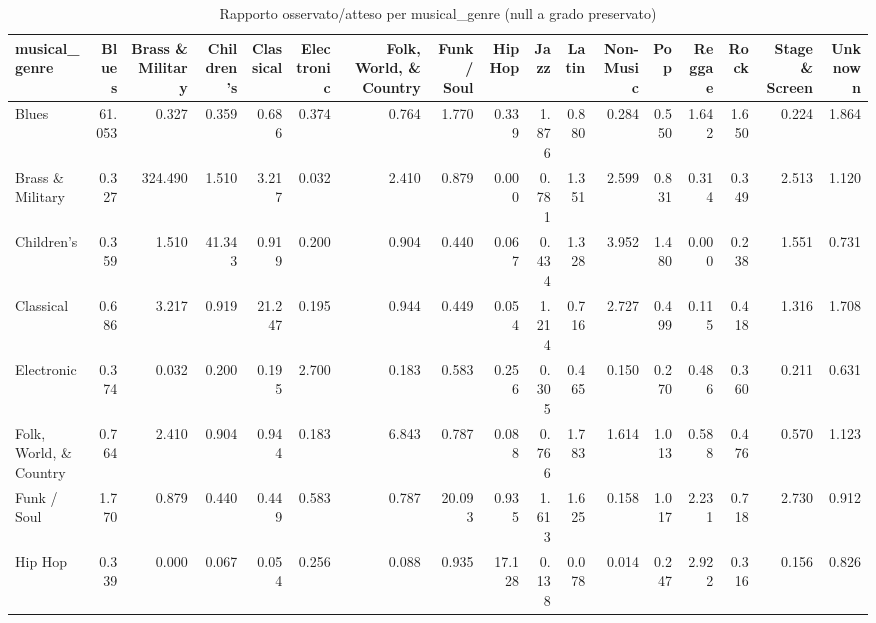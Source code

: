 \begin{table}
\centering
\caption{Rapporto osservato/atteso per musical_genre (null a grado preservato)}
\label{tab:t3_mixing_genere_musicale_oss_att}
\begin{tabular}{lrrrrrrrrrrrrrrrr}
\toprule
         musical\_genre &  Blues &  Brass \& Military &  Children's &  Classical &  Electronic &  Folk, World, \& Country &  Funk / Soul &  Hip Hop &  Jazz &  Latin &  Non-Music &   Pop &  Reggae &  Rock &  Stage \& Screen &  Unknown \\
\midrule
                 Blues & 61.053 &             0.327 &       0.359 &      0.686 &       0.374 &                   0.764 &        1.770 &    0.339 & 1.876 &  0.880 &      0.284 & 0.550 &   1.642 & 1.650 &           0.224 &    1.864 \\
      Brass \& Military &  0.327 &           324.490 &       1.510 &      3.217 &       0.032 &                   2.410 &        0.879 &    0.000 & 0.781 &  1.351 &      2.599 & 0.831 &   0.314 & 0.349 &           2.513 &    1.120 \\
            Children's &  0.359 &             1.510 &      41.343 &      0.919 &       0.200 &                   0.904 &        0.440 &    0.067 & 0.434 &  1.328 &      3.952 & 1.480 &   0.000 & 0.238 &           1.551 &    0.731 \\
             Classical &  0.686 &             3.217 &       0.919 &     21.247 &       0.195 &                   0.944 &        0.449 &    0.054 & 1.214 &  0.716 &      2.727 & 0.499 &   0.115 & 0.418 &           1.316 &    1.708 \\
            Electronic &  0.374 &             0.032 &       0.200 &      0.195 &       2.700 &                   0.183 &        0.583 &    0.256 & 0.305 &  0.465 &      0.150 & 0.270 &   0.486 & 0.360 &           0.211 &    0.631 \\
Folk, World, \& Country &  0.764 &             2.410 &       0.904 &      0.944 &       0.183 &                   6.843 &        0.787 &    0.088 & 0.766 &  1.783 &      1.614 & 1.013 &   0.588 & 0.476 &           0.570 &    1.123 \\
           Funk / Soul &  1.770 &             0.879 &       0.440 &      0.449 &       0.583 &                   0.787 &       20.093 &    0.935 & 1.613 &  1.625 &      0.158 & 1.017 &   2.231 & 0.718 &           2.730 &    0.912 \\
               Hip Hop &  0.339 &             0.000 &       0.067 &      0.054 &       0.256 &                   0.088 &        0.935 &   17.128 & 0.138 &  0.078 &      0.014 & 0.247 &   2.922 & 0.316 &           0.156 &    0.826 \\

\end{tabular}
\end{table}
